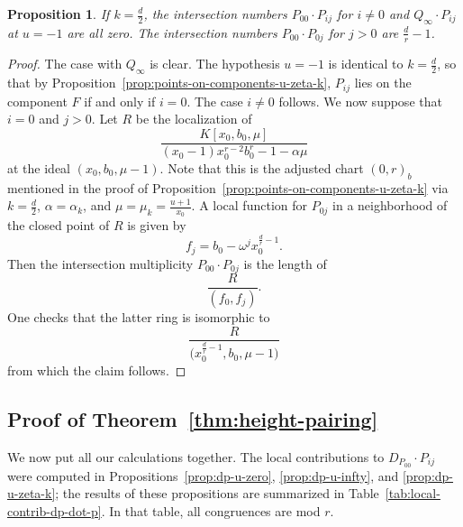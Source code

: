\documentclass[reqno]{amsart}
\newtheorem{proposition}[thm]{Proposition}
\theoremstyle{definition}
\theoremstyle{remark}
\begin{document}
\begin{proposition}\label{prop:local-intersections-u-minus-1}
  If $k = \frac{d}{2}$, the intersection numbers $P_{00} \cdot P_{ij}$ for $i \neq 0$ and $Q_{\infty} \cdot P_{ij}$ at $u = -1$ are all zero. The intersection numbers $P_{00} \cdot P_{0j}$ for $j > 0$ are $\frac{d}{r} - 1$.
\end{proposition}

\begin{proof}
  The case with $Q_\infty$ is clear. The hypothesis $u = -1$ is identical to $k = \frac{d}{2}$, so that by Proposition~\ref{prop:points-on-components-u-zeta-k}, $P_{ij}$ lies on the component $F$ if and only if $i = 0$. The case $i \neq 0$ follows. We now suppose that $i = 0$ and $j > 0$. Let $R$ be the localization of
  \[
  \frac{K[x_0,b_0,\mu]}{(x_0 - 1)x_0^{r-2}b_0^r - 1 - \alpha \mu}
  \]
  at the ideal $(x_0, b_0, \mu - 1)$. Note that this is the adjusted chart $(0,r)_b$ mentioned in the proof of Proposition~\ref{prop:points-on-components-u-zeta-k} via $k = \frac{d}{2}$, $\alpha = \alpha_k$, and $\mu = \mu_k = \frac{u+1}{x_0}$. A local function for $P_{0j}$ in a neighborhood of the closed point of $R$ is given by
  \[
  f_j = b_0 - \omega^j x_0^{\frac{d}{r} - 1}.
  \]
  Then the intersection multiplicity $P_{00} \cdot P_{0j}$ is the length of 
  \[
  \frac{R}{(f_0, f_j)}.
  \]
  One checks that the latter ring is isomorphic to
  \[
  \frac{R}{\bigg(x_0^{\frac{d}{r} - 1}, b_0, \mu - 1\bigg)}
  \]
  from which the claim follows.
\end{proof}

\subsection{Proof of Theorem~\ref{thm:height-pairing}}
\label{sec:proof-theor-refthm:h}

We now put all our calculations together. The local contributions to $D_{P_{00}} \cdot P_{ij}$ were computed in Propositions~\ref{prop:dp-u-zero}, \ref{prop:dp-u-infty}, and \ref{prop:dp-u-zeta-k}; the results of these propositions are summarized in Table~\ref{tab:local-contrib-dp-dot-p}. In that table, all congruences are mod $r$.
\end{document}

